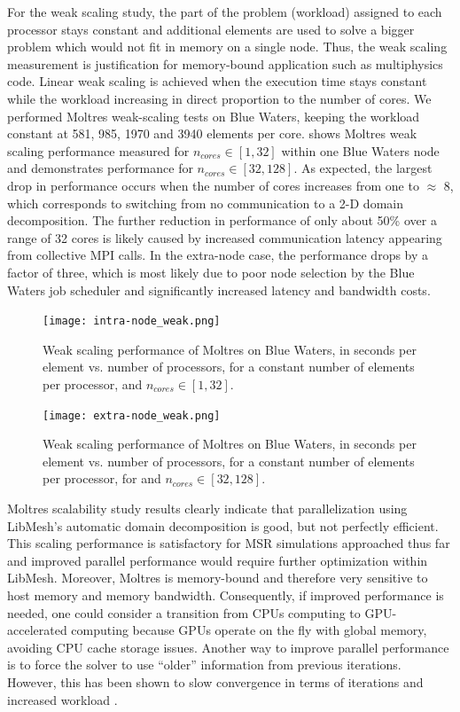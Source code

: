 \documentclass{article}
\begin{document}
For the weak scaling study, the part of the problem (workload) assigned
to each processor stays constant and additional elements are used to
solve a bigger problem which would not fit in memory on a single node.
Thus, the weak scaling measurement is justification for memory-bound
application such as multiphysics code. Linear weak scaling is achieved
when the execution time stays constant while the workload increasing
in direct proportion to the number of cores. We performed Moltres
weak-scaling tests on Blue Waters, keeping the workload constant at
581, 985, 1970 and 3940 elements per core.  shows
Moltres weak scaling performance measured for $n_{cores} \in [1,32]$ within
one Blue Waters node and  demonstrates performance
for $n_{cores} \in [32,128]$. As expected, the largest drop in performance
occurs when the number of cores increases from one to $\approx$ 8, which
corresponds to switching from no communication to a 2-D domain
decomposition. The further reduction in performance of only about 50\%
over a range of 32 cores is likely caused by increased communication
latency appearing from collective \gls{MPI} calls. In the extra-node case,
the performance drops by a factor of three, which is most likely due to poor node
selection by the Blue Waters job scheduler and significantly increased latency and
bandwidth costs.

\begin{figure}[htpb]
  \centering
  \texttt{[image: intra-node\_weak.png]}
  \caption{Weak scaling performance of Moltres on Blue Waters, in seconds per element vs. number of processors, for a constant number of elements
        per processor, and $n_{cores}\in[1,32]$.}
  \label{fig:intra_weak}
\end{figure}

\begin{figure}[htpb]
  \centering
  \texttt{[image: extra-node\_weak.png]}
  \caption{Weak scaling performance of Moltres on Blue Waters, in seconds per element vs. number of processors, for a constant number of elements
        per processor, for and $n_{cores}\in[32,128]$.}
  \label{fig:extra_weak}
\end{figure}

Moltres scalability study results clearly indicate that parallelization
using LibMesh's automatic domain decomposition is good, but not perfectly
efficient. This scaling performance is satisfactory for \gls{MSR} simulations
approached thus far and improved parallel performance would require further optimization
within LibMesh.  Moreover, Moltres is memory-bound and therefore very sensitive to host memory and memory
bandwidth. Consequently, if improved performance is needed, one could consider a transition from CPUs
computing to GPU-accelerated computing because GPUs operate on the fly with
global memory, avoiding CPU cache storage issues. Another way
to improve parallel performance is to force the solver to use
``older'' information from previous iterations. However, this has been shown to
slow convergence in terms of iterations and increased workload
\cite{satish_balay_petsc_2015}.
\end{document}
